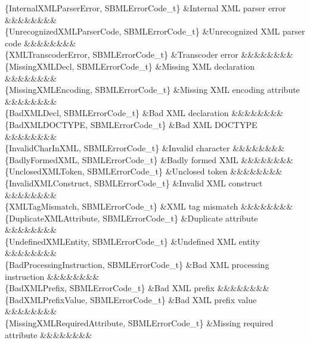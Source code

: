 \begin{DoxyParagraph}{}
\begin{longtabu}
\{Internal\+X\+M\+L\+Parser\+Error, S\+B\+M\+L\+Error\+Code\+\_\+t\} &Internal X\+ML parser error &&&&&&&&\\
\{Unrecognized\+X\+M\+L\+Parser\+Code, S\+B\+M\+L\+Error\+Code\+\_\+t\} &Unrecognized X\+ML parser code &&&&&&&&\\
\{X\+M\+L\+Transcoder\+Error, S\+B\+M\+L\+Error\+Code\+\_\+t\} &Transcoder error &&&&&&&&\\
\{Missing\+X\+M\+L\+Decl, S\+B\+M\+L\+Error\+Code\+\_\+t\} &Missing X\+ML declaration &&&&&&&&\\
\{Missing\+X\+M\+L\+Encoding, S\+B\+M\+L\+Error\+Code\+\_\+t\} &Missing X\+ML encoding attribute &&&&&&&&\\
\{Bad\+X\+M\+L\+Decl, S\+B\+M\+L\+Error\+Code\+\_\+t\} &Bad X\+ML declaration &&&&&&&&\\
\{Bad\+X\+M\+L\+D\+O\+C\+T\+Y\+PE, S\+B\+M\+L\+Error\+Code\+\_\+t\} &Bad X\+ML D\+O\+C\+T\+Y\+PE &&&&&&&&\\
\{Invalid\+Char\+In\+X\+ML, S\+B\+M\+L\+Error\+Code\+\_\+t\} &Invalid character &&&&&&&&\\
\{Badly\+Formed\+X\+ML, S\+B\+M\+L\+Error\+Code\+\_\+t\} &Badly formed X\+ML &&&&&&&&\\
\{Unclosed\+X\+M\+L\+Token, S\+B\+M\+L\+Error\+Code\+\_\+t\} &Unclosed token &&&&&&&&\\
\{Invalid\+X\+M\+L\+Construct, S\+B\+M\+L\+Error\+Code\+\_\+t\} &Invalid X\+ML construct &&&&&&&&\\
\{X\+M\+L\+Tag\+Mismatch, S\+B\+M\+L\+Error\+Code\+\_\+t\} &X\+ML tag mismatch &&&&&&&&\\
\{Duplicate\+X\+M\+L\+Attribute, S\+B\+M\+L\+Error\+Code\+\_\+t\} &Duplicate attribute &&&&&&&&\\
\{Undefined\+X\+M\+L\+Entity, S\+B\+M\+L\+Error\+Code\+\_\+t\} &Undefined X\+ML entity &&&&&&&&\\
\{Bad\+Processing\+Instruction, S\+B\+M\+L\+Error\+Code\+\_\+t\} &Bad X\+ML processing instruction &&&&&&&&\\
\{Bad\+X\+M\+L\+Prefix, S\+B\+M\+L\+Error\+Code\+\_\+t\} &Bad X\+ML prefix &&&&&&&&\\
\{Bad\+X\+M\+L\+Prefix\+Value, S\+B\+M\+L\+Error\+Code\+\_\+t\} &Bad X\+ML prefix value &&&&&&&&\\
\{Missing\+X\+M\+L\+Required\+Attribute, S\+B\+M\+L\+Error\+Code\+\_\+t\} &Missing required attribute &&&&&&&&\\

\end{longtabu}
\end{DoxyParagraph}

